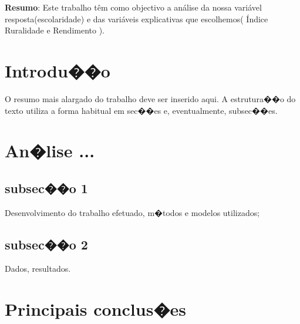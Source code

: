 


\setcounter {table}{0}
\setcounter{equation}{0}
\setcounter{figure}{0}
\setcounter{section}{0}

\pagestyle{plain}







\vspace{0.3cm}

\medskip

\thispagestyle{empty}
\textbf{Resumo}: Este trabalho têm como objectivo a análise da nossa variável resposta(escolaridade) e das variáveis explicativas que escolhemos( Índice Ruralidade e Rendimento ).

\newpage
\section{Introdu��o}
O resumo mais alargado do trabalho deve ser inserido aqui. A estrutura��o do texto utiliza a forma habitual em sec��es e, eventualmente, subsec��es.

\section{An�lise ...}

\subsection{subsec��o 1}
Desenvolvimento do trabalho efetuado, m�todos e modelos utilizados;\\

\subsection{subsec��o 2}
Dados, resultados.


\section{Principais conclus�es}

